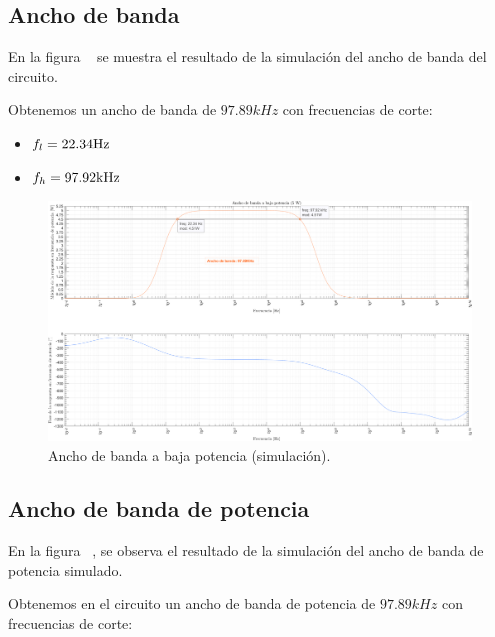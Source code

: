 \clearpage

\subsection{Ancho de banda}

\par En la figura ~ se muestra el resultado de la simulación del ancho de banda del circuito.
\par Obtenemos un ancho de banda de $97.89kHz$ con frecuencias de corte:

\begin{itemize}
    \item $f_l =22.34 \si[per-mode=symbol]{\hertz}$
    \item $f_h =97.92 \si[per-mode=symbol]{\kilo\hertz}$
\end{itemize}

\vfill

\clearpage

\begin{figure}[H]
    \centering
    \includegraphics[angle=90,scale=0.45]{./img/simulaciones/BW/Low_power_BW.png}
    \caption{Ancho de banda a baja potencia (simulación).}
    \label{fig:Low_power_BW}
\end{figure}


\subsection{Ancho de banda de potencia}

\par En la figura ~, se observa el resultado de la simulación del ancho de banda de potencia simulado.
\par Obtenemos en el circuito un ancho de banda de potencia de $97.89kHz$ con frecuencias de corte:


